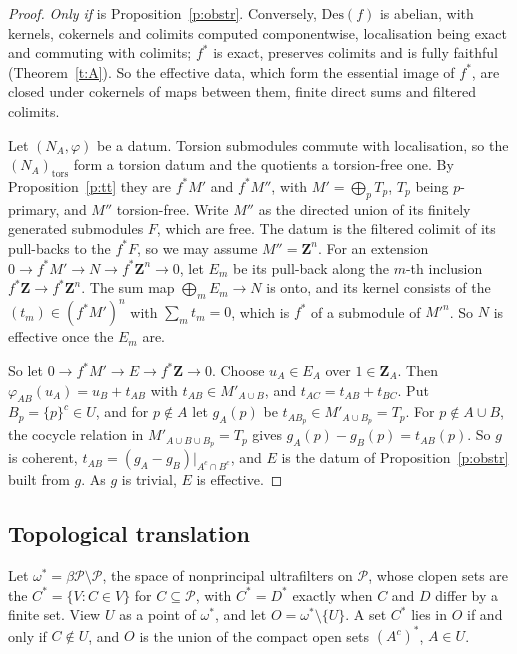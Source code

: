 \documentclass[11pt,a4paper]{amsart}
\theoremstyle{definition}
\theoremstyle{remark}
\newcommand{\Z}{\mathbf Z}
\newcommand{\Pp}{\mathcal P}
\newcommand{\Des}{\mathrm{Des}}
\begin{document}
\begin{proof}
\emph{Only if} is Proposition~\ref{p:obstr}. Conversely, $\Des(f)$ is abelian, with kernels, cokernels and colimits computed componentwise, localisation being exact and commuting with colimits; $f^*$ is exact, preserves colimits and is fully faithful (Theorem~\ref{t:A}). So the effective data, which form the essential image of $f^*$, are closed under cokernels of maps between them, finite direct sums and filtered colimits.

Let $(N_A,\varphi)$ be a datum. Torsion submodules commute with localisation, so the $(N_A)_{\mathrm{tors}}$ form a torsion datum and the quotients a torsion-free one. By Proposition~\ref{p:tt} they are $f^*M'$ and $f^*M''$, with $M'=\bigoplus_pT_p$, $T_p$ being $p$-primary, and $M''$ torsion-free. Write $M''$ as the directed union of its finitely generated submodules $F$, which are free. The datum is the filtered colimit of its pull-backs to the $f^*F$, so we may assume $M''=\Z^n$. For an extension $0\to f^*M'\to N\to f^*\Z^n\to0$, let $E_m$ be its pull-back along the $m$-th inclusion $f^*\Z\to f^*\Z^n$. The sum map $\bigoplus_mE_m\to N$ is onto, and its kernel consists of the $(t_m)\in(f^*M')^n$ with $\sum_mt_m=0$, which is $f^*$ of a submodule of $M'^n$. So $N$ is effective once the $E_m$ are.

So let $0\to f^*M'\to E\to f^*\Z\to0$. Choose $u_A\in E_A$ over $1\in\Z_A$. Then $\varphi_{AB}(u_A)=u_B+t_{AB}$ with $t_{AB}\in M'_{A\cup B}$, and $t_{AC}=t_{AB}+t_{BC}$. Put $B_p=\{p\}^c\in U$, and for $p\notin A$ let $g_A(p)$ be $t_{AB_p}\in M'_{A\cup B_p}=T_p$. For $p\notin A\cup B$, the cocycle relation in $M'_{A\cup B\cup B_p}=T_p$ gives $g_A(p)-g_B(p)=t_{AB}(p)$. So $g$ is coherent, $t_{AB}=(g_A-g_B)|_{A^c\cap B^c}$, and $E$ is the datum of Proposition~\ref{p:obstr} built from $g$. As $g$ is trivial, $E$ is effective.
\end{proof}

\subsection{Topological translation}
Let $\omega^*=\beta\Pp\setminus\Pp$, the space of nonprincipal ultrafilters on $\Pp$, whose clopen sets are the $C^*=\{V:C\in V\}$ for $C\subseteq\Pp$, with $C^*=D^*$ exactly when $C$ and $D$ differ by a finite set. View $U$ as a point of $\omega^*$, and let $O=\omega^*\setminus\{U\}$. A set $C^*$ lies in $O$ if and only if $C\notin U$, and $O$ is the union of the compact open sets $(A^c)^*$, $A\in U$.
\end{document}

